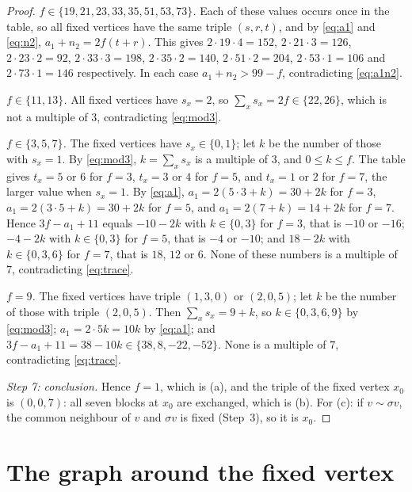 \documentclass[11pt,a4paper]{article}
\theoremstyle{definition}
\theoremstyle{remark}
\newcommand{\sg}{\sigma}
\begin{document}
\begin{proof}
\smallskip\noindent\emph{$f\in\{19,21,23,33,35,51,53,73\}$.} Each of these values occurs once in the table, so all
fixed vertices have the same triple $(s,r,t)$, and by \eqref{eq:a1} and \eqref{eq:n2}, $a_1+n_2=2f(t+r)$. This gives
$2\cdot19\cdot4=152$, $2\cdot21\cdot3=126$, $2\cdot23\cdot2=92$, $2\cdot33\cdot3=198$, $2\cdot35\cdot2=140$,
$2\cdot51\cdot2=204$, $2\cdot53\cdot1=106$ and $2\cdot73\cdot1=146$ respectively. In each case
$a_1+n_2>99-f$, contradicting \eqref{eq:a1n2}.

\smallskip\noindent\emph{$f\in\{11,13\}$.} All fixed vertices have $s_x=2$, so $\sum_xs_x=2f\in\{22,26\}$, which is
not a multiple of $3$, contradicting \eqref{eq:mod3}.

\smallskip\noindent\emph{$f\in\{3,5,7\}$.} The fixed vertices have $s_x\in\{0,1\}$; let $k$ be the number of those
with $s_x=1$. By \eqref{eq:mod3}, $k=\sum_xs_x$ is a multiple of $3$, and $0\le k\le f$. The table gives $t_x=5$ or
$6$ for $f=3$, $t_x=3$ or $4$ for $f=5$, and $t_x=1$ or $2$ for $f=7$, the larger value when $s_x=1$. By
\eqref{eq:a1}, $a_1=2(5\cdot3+k)=30+2k$ for $f=3$, $a_1=2(3\cdot5+k)=30+2k$ for $f=5$, and $a_1=2(7+k)=14+2k$ for
$f=7$. Hence $3f-a_1+11$ equals $-10-2k$ with $k\in\{0,3\}$ for $f=3$, that is $-10$ or $-16$; $-4-2k$ with
$k\in\{0,3\}$ for $f=5$, that is $-4$ or $-10$; and $18-2k$ with $k\in\{0,3,6\}$ for $f=7$, that is $18$, $12$ or
$6$. None of these numbers is a multiple of $7$, contradicting \eqref{eq:trace}.

\smallskip\noindent\emph{$f=9$.} The fixed vertices have triple $(1,3,0)$ or $(2,0,5)$; let $k$ be the number of
those with triple $(2,0,5)$. Then $\sum_xs_x=9+k$, so $k\in\{0,3,6,9\}$ by \eqref{eq:mod3}; $a_1=2\cdot5k=10k$ by
\eqref{eq:a1}; and $3f-a_1+11=38-10k\in\{38,8,-22,-52\}$. None is a multiple of $7$, contradicting
\eqref{eq:trace}.

\medskip\noindent\emph{Step 7: conclusion.}
Hence $f=1$, which is (a), and the triple of the fixed vertex $x_0$ is $(0,0,7)$: all seven blocks at $x_0$ are
exchanged, which is (b). For (c): if $v\sim\sg v$, the common neighbour of $v$ and $\sg v$ is fixed (Step~3), so
it is $x_0$.
\end{proof}

\section{The graph around the fixed vertex}\label{sec:local}
\end{document}
